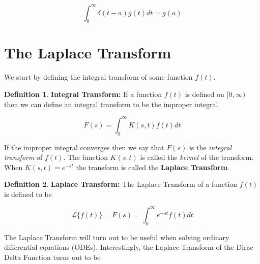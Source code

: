 \documentclass{article}
\theoremstyle{definition}
\newtheorem{definition}{Definition}[section]
\begin{document}
\bigskip
\begin{equation*}
  \int_{0}^{\infty} \delta (t-a) g(t) dt = g(a)
\end{equation*}

\bigskip
\section{The Laplace Transform}
\label{sec:laplace_transform}
We start by defining the integral transform of some function $f(t)$.

\bigskip
\begin{definition} 
{\bf Integral Transform:} If a function $f(t)$ is defined on $[0,\infty)$ then we can define an integral transform to be the improper integral
\end{definition}

\begin{equation*}
F(s) = \int_0^\infty K(s,t) f(t) dt
\end{equation*}

\bigskip
\noindent
If the improper integral converges then we say that $F(s)$ is the \emph{integral transform} of $f(t)$. The function $K(s,t)$ is called the \emph{kernel}
of the transform. When $K(s,t) = e^{-st}$ the transform is called the {\bf Laplace Transform}.

\bigskip
\begin{definition} 
{\bf Laplace Transform:} The Laplace Transform of a function $f(t)$ is defined to be
\label{def:laplace_transform}
\end{definition}


\begin{equation}
\mathcal{L}\{f(t)\} = F(s) = \int_0^\infty e^{-st} f(t) dt
\label{eqn:laplace_transform}
\end{equation}

\bigskip
\noindent
The Laplace Transform will turn out to be useful when solving ordinary differential equations (ODEs). Interestingly, the Laplace Transform of the 
Dirac Delta Function turns out to be
\end{document}

